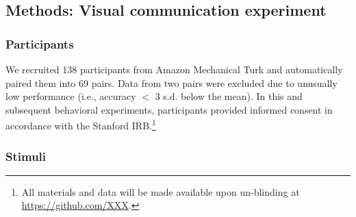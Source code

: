 \documentclass[10pt,letterpaper]{article}
\begin{document}


\subsection{Methods: Visual communication experiment}

\subsubsection{Participants} We recruited 138 participants from Amazon Mechanical Turk and automatically paired them into 69 pairs.
Data from two pairs were excluded due to unusually low performance (i.e., accuracy $<$ 3 s.d. below the mean).
In this and subsequent behavioral experiments, participants provided informed consent in accordance with the Stanford IRB.\footnote{All materials and data will be made available upon un-blinding at \url{https://github.com/XXX}.}

\subsubsection{Stimuli} 
\end{document}
